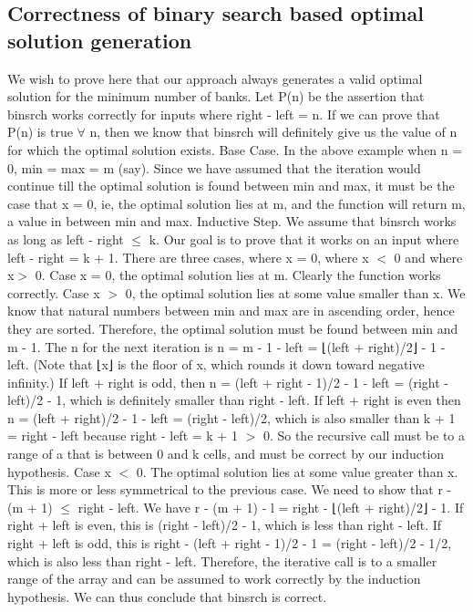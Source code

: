 \subsection{Correctness of binary search based optimal solution generation}\label{cabsos}
We wish to prove here that our approach always generates a valid optimal solution for the minimum number of banks.
Let P(n) be the assertion that binsrch works correctly for inputs where right - left = n. If we can prove that P(n) is true 
$\forall$ n, then we know that binsrch will definitely give us the value of n for which the optimal solution exists. 
\newline
\newline
Base Case. In the above example when n = 0, min = max = m (say). Since we have assumed that the iteration would continue 
till the optimal solution is found between min and max, it must be the case that x = 0, ie, the optimal solution lies at m,
and the function will return m, a value in between min and max.
\newline
\newline
Inductive Step. We assume that binsrch works as long as left - right $\leq$ k. Our goal is to prove that it works on an input 
where left - right = k + 1. There are three cases, where x = 0, where x $<$ 0 and where x$>$ 0.
\newline
\newline
Case x = 0, the optimal solution lies at m. Clearly the function works correctly.
\newline
\newline
Case x $>$ 0, the optimal solution lies at some value smaller than x. We know that natural numbers between min and max are in 
ascending order, hence they are sorted. Therefore, the optimal solution must be found between min and m - 1. The n for the 
next iteration is n = m - 1 - left = ⌊(left + right)/2⌋ - 1 - left. (Note that ⌊x⌋ is the floor of x, which rounds it down 
toward negative infinity.) If left + right is odd, then n = (left + right - 1)/2 - 1 - left = (right - left)/2 - 1, which is 
definitely smaller than right - left. If left + right is even then n = (left + right)/2 - 1 - left = (right - left)/2, which 
is also smaller than k + 1 = right - left because right - left = k + 1 $>$ 0. So the recursive call must be to a range of a 
that is between 0 and k cells, and must be correct by our induction hypothesis.
\newline
\newline
Case x $<$ 0. The optimal solution lies at some value greater than x. This is more or less symmetrical to the previous case. 
We need to show that r - (m + 1) $\leq$ right - left. We have r - (m + 1) - l = right - ⌊(left + right)/2⌋ - 1. If right + left is 
even, this is (right - left)/2 - 1, which is less than right - left. If right + left is odd, this is 
right - (left + right - 1)/2 - 1 = (right - left)/2 - 1/2, which is also less than right - left. Therefore, the iterative call 
is to a smaller range of the array and can be assumed to work correctly by the induction hypothesis. We can thus conclude that binsrch is correct.

